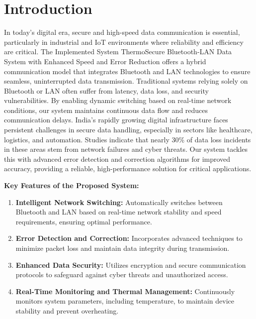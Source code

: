 \documentclass[12pt]{report}
\begin{document}
\section{Introduction}
\begin{flushleft}
In today's digital era, secure and high-speed data communication is essential, particularly in industrial and IoT environments where reliability and efficiency are critical. The Implemented System ThermoSecure Bluetooth-LAN Data System with Enhanced Speed and Error Reduction offers a hybrid communication model that integrates Bluetooth and LAN technologies to ensure seamless, uninterrupted data transmission. Traditional systems relying solely on Bluetooth or LAN often suffer from latency, data loss, and security vulnerabilities. By enabling dynamic switching based on real-time network conditions, our system maintains continuous data flow and reduces communication delays. India's rapidly growing digital infrastructure faces persistent challenges in secure data handling, especially in sectors like healthcare, logistics, and automation. Studies indicate that nearly 30\% of data loss incidents in these areas stem from network failures and cyber threats. Our system tackles this with advanced error detection and correction algorithms for improved accuracy, providing a reliable, high-performance solution for critical applications.
\end{flushleft}

\begin{flushleft}
\textbf{Key Features of the Proposed System:}
\begin{enumerate}[leftmargin=*]
    \item \textbf{Intelligent Network Switching:} Automatically switches between Bluetooth and LAN based on real-time network stability and speed requirements, ensuring optimal performance.
    \item \textbf{Error Detection and Correction:} Incorporates advanced techniques to minimize packet loss and maintain data integrity during transmission.
    \item \textbf{Enhanced Data Security:} Utilizes encryption and secure communication protocols to safeguard against cyber threats and unauthorized access.
    \item \textbf{Real-Time Monitoring and Thermal Management:} Continuously monitors system parameters, including temperature, to maintain device stability and prevent overheating.
\end{enumerate}
\end{flushleft}
\end{document}
